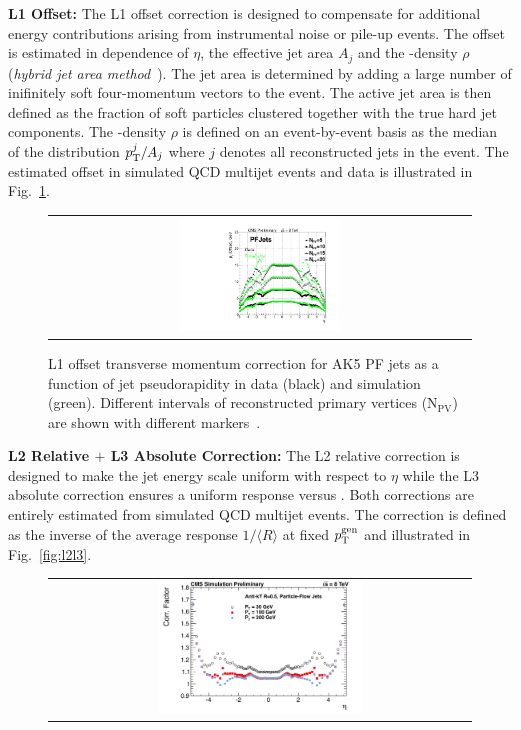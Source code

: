 \begin{description}
 \item \textbf{L1 Offset:} The L1 offset correction is designed to compensate for additional energy contributions arising from instrumental noise or pile-up events. The \pt offset is estimated in dependence of $\eta$, the effective jet area $A_j$ and the \pt-density $\rho$ (\textit{hybrid jet area method}~\cite{Cacciari2008119}). The jet area is determined by adding a large number of inifinitely soft four-momentum vectors to the event. The active jet area is then defined as the fraction of soft particles clustered together with the true hard jet components. The \pt-density $\rho$ is defined on an event-by-event basis as the median of the distribution $p_{\text{T}}^{j}/A_{j}$ where $j$ denotes all reconstructed jets in the event. The estimated offset in simulated QCD multijet events and data is illustrated in Fig.~\ref{fig:l1offset}.
\begin{figure}[!h]
  \centering 
  \begin{tabular}{c}
    \includegraphics[width=0.39\textwidth]{figures/OffsetVsEta_NPV_PF5_data53_vs_mc53.pdf} 
  \end{tabular}
  \caption{L1 offset transverse momentum correction for AK5 PF jets as a function of jet pseudorapidity in data (black) and simulation (green). Different intervals of reconstructed primary vertices ($\mathrm{N_{PV}}$) are shown with different markers~\cite{CMS-DP-2013-033}.}
  \label{fig:l1offset}
\end{figure}
 \item \textbf{L2 Relative $+$ L3 Absolute Correction:} The L2 relative correction is designed to make the jet energy scale uniform with respect to $\eta$ while the L3 absolute correction ensures a uniform response versus \pt. Both corrections are entirely estimated from simulated QCD multijet events. The correction is defined as the inverse of the average response $1/\langle R \rangle$ at fixed $p_{\text{T}}^\mathrm{gen}$ and illustrated in Fig.~\ref{fig:l2l3}.
\begin{figure}[!h]
  \centering 
  \begin{tabular}{c}
    \includegraphics[width=0.5\textwidth]{figures/CorrectionVsEta_Overview_TDR_ak5pfl1_L2L3.pdf} 

\end{tabular}
\end{figure}
\end{description}
